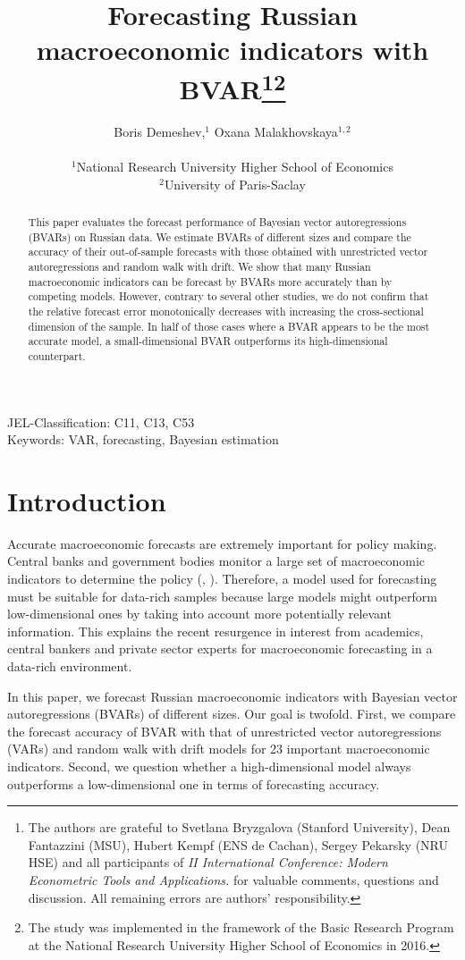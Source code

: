 \documentclass[11pt]{article} %
\title{Forecasting Russian macroeconomic indicators with BVAR\footnote{The authors are grateful to Svetlana Bryzgalova (Stanford University), Dean Fantazzini (MSU),  Hubert Kempf (ENS de Cachan), Sergey Pekarsky (NRU HSE) and all participants of \textit{II International Conference: Modern Econometric Tools and Applications.} for valuable comments, questions and discussion. All remaining errors are authors’ responsibility.}\footnote{The study was implemented in the framework of the Basic Research Program at the National Research University Higher School of Economics in 2016.
}}
\author{Boris Demeshev,$^{1}$   Oxana Malakhovskaya$^{1,2}$\\
\\
\normalsize{$^{1}$National Research University Higher School of Economics}\\
\normalsize{$^{2}$University of Paris-Saclay}\\
}
\date{}
\begin{document}
\maketitle



\begin{abstract}
This paper evaluates the forecast performance of Bayesian vector autoregressions (BVARs) on Russian data. We estimate BVARs of different sizes and compare the accuracy of their out-of-sample forecasts with those obtained with unrestricted vector autoregressions and random walk with drift. We show that many Russian macroeconomic indicators can be forecast by BVARs more accurately than by competing models. However, contrary to several other studies, we do not confirm that the relative forecast error monotonically decreases with increasing the cross-sectional dimension of the sample. In half of those cases where a BVAR appears to be the most accurate model, a small-dimensional BVAR outperforms its high-dimensional counterpart.
\end{abstract}

\smallskip
\noindent JEL-Classification: C11, C13, C53\\
\smallskip
\noindent Keywords: VAR, forecasting, Bayesian estimation

\section{Introduction}

Accurate macroeconomic forecasts are extremely important for policy making. Central banks and government bodies monitor a large set of macroeconomic indicators to determine the policy (\cite{beckner_1996}, \cite{bernanke_boivin_2003}). Therefore, a model used for forecasting must be suitable for data-rich samples because large models might outperform low-dimensional ones by taking into account more potentially relevant information. This explains the recent resurgence in interest from academics, central bankers and private sector experts for macroeconomic forecasting in a data-rich environment.

In this paper, we forecast Russian macroeconomic indicators with Bayesian vector autoregressions (BVARs) of different sizes. Our goal is twofold.  First, we compare the forecast accuracy of BVAR with that of unrestricted vector autoregressions (VARs) and random walk with drift models for 23 important macroeconomic indicators. Second, we  question whether a high-dimensional model always outperforms a low-dimensional one in terms of forecasting accuracy.
\end{document}

